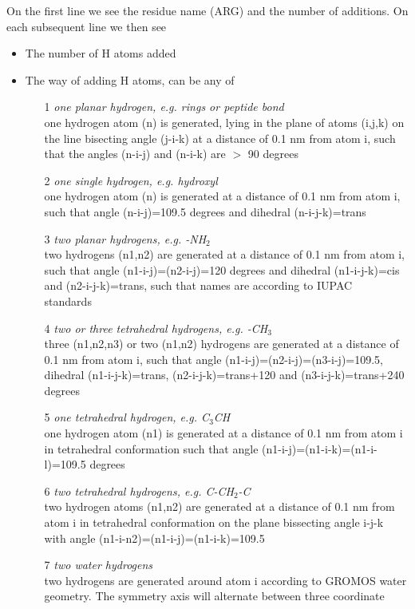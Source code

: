 On the first line we see the residue name (ARG) and the number of additions.
On each subsequent line we then see 
\begin{itemize}
\item The number of H atoms added
\item The way of adding H atoms, can be any of
\begin{enumerate}
\item[1]{\em one planar hydrogen, e.g. rings or peptide bond}\\
one hydrogen atom (n) is generated, lying in the plane of atoms
(i,j,k) on the line bisecting angle (j-i-k) at a distance of 0.1 nm
from atom i, such that the angles (n-i-j) and (n-i-k) are $>$ 90
degrees
\item[2]{\em one single hydrogen, e.g. hydroxyl}\\
one hydrogen atom (n) is generated at a distance of 0.1 nm from atom
i, such that angle (n-i-j)=109.5 degrees and dihedral (n-i-j-k)=trans
\item[3]{\em two planar hydrogens, e.g. -NH{$_2$}}\\
two hydrogens (n1,n2) are generated at a distance of 0.1 nm from atom
i, such that angle (n1-i-j)=(n2-i-j)=120 degrees and dihedral
(n1-i-j-k)=cis and (n2-i-j-k)=trans, such that names are according to
IUPAC standards~\cite{iupac70}
\item[4]{\em two or three tetrahedral hydrogens, e.g. -CH{$_3$}}\\
three (n1,n2,n3) or two (n1,n2) hydrogens are generated at a distance
of 0.1 nm from atom i, such that angle
(n1-i-j)=(n2-i-j)=(n3-i-j)=109.5, dihedral (n1-i-j-k)=trans,
(n2-i-j-k)=trans+120 and (n3-i-j-k)=trans+240 degrees
\item[5]{\em one tetrahedral hydrogen, e.g. C{$_3$}CH}\\
one hydrogen atom (n1) is generated at a distance of 0.1 nm from atom
i in tetrahedral conformation such that angle
(n1-i-j)=(n1-i-k)=(n1-i-l)=109.5 degrees
\item[6]{\em two tetrahedral hydrogens, e.g. C-CH{$_2$}-C}\\
two hydrogen atoms (n1,n2) are generated at a distance of 0.1 nm from
atom i in tetrahedral conformation on the plane bissecting angle i-j-k
with angle (n1-i-n2)=(n1-i-j)=(n1-i-k)=109.5
\item[7]{\em two water hydrogens}\\
two hydrogens are generated around atom i according to GROMOS water
geometry. The symmetry axis will alternate between three coordinate

\end{enumerate}
\end{itemize}
